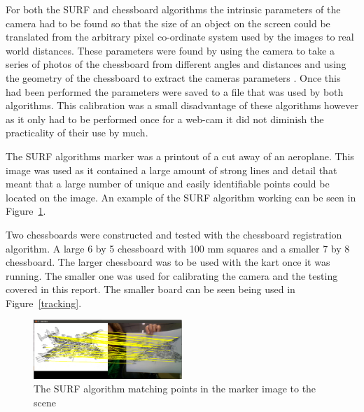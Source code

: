 For both the SURF and chessboard algorithms the intrinsic parameters of the camera had to be found so that the size of an object on the screen could be translated from the arbitrary pixel co-ordinate system used by the images to real world distances. These parameters were found by using the camera to take a series of photos of the chessboard from different angles and distances and using the geometry of the chessboard to extract the cameras parameters \cite{cali}. Once this had been performed the parameters were saved to a file that was used by both algorithms. This calibration was a small disadvantage of these algorithms however as it only had to be performed once for a web-cam it did not diminish the practicality of their use by much.

The SURF algorithms marker was a printout of a cut away of an aeroplane. This image was used as it contained a large amount of strong lines and detail that meant that a large number of unique and easily identifiable points could be located on the image. An example of the SURF algorithm working can be seen in Figure~\ref{plane}. 

Two chessboards were constructed and tested with the chessboard registration algorithm. A large 6 by 5 chessboard with 100 mm squares and a smaller 7 by 8 chessboard. The larger chessboard was to be used with the kart once it was running. The smaller one was used for calibrating the camera and the testing covered in this report. The smaller board can be seen being used in Figure~\ref{tracking}. 

\begin{figure}[ht]
	\begin{center}
		\includegraphics[width=0.5\textwidth]{surf_match}
	\end{center}
	\caption{The SURF algorithm matching points in the marker image to the scene}
	\label{plane}
\end{figure}